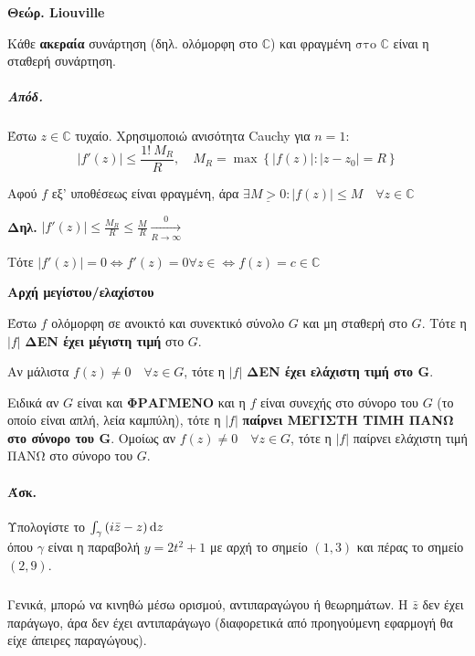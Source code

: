 \documentclass[12pt,a4paper,notitlepage,fleqn]{article}
\begin{document}
\begin{enumparen}
    	\item \textbf{Θεώρ. Liouville}

    	Κάθε \textbf{ακεραία} συνάρτηση (δηλ. ολόμορφη στο \( \mathbb C  \)) και φραγμένη
    	\( \boxed{\text{στο } \mathbb C}  \) είναι η σταθερή συνάρτηση.
    	\subparagraph{Απόδ.}
    	Έστω \( z \in \mathbb C  \) τυχαίο. Χρησιμοποιώ ανισότητα Cauchy για \( n=1 \):
    	\[
    	\left|f'(z)\right| \leq \frac{1!\ M_R}{R},\quad M_R = \max
    	\left\lbrace \left|f(z)\right|: |z-z_0|=R \right\rbrace
    	\]

    	Αφού \( f \) εξ' υποθέσεως είναι φραγμένη, άρα \( \exists \underline{M > 0}:
    	\left|f(z)\right| \leq M \quad \forall z \in \mathbb C
    	 \)

    	\textbf{Δηλ.} \(  \displaystyle
    	\left|f'(z)\right| \leq \frac{M_R}{R} \leq \frac{M}{R}
    	\xrightarrow[R\to \infty] 0
    	 \)

        Τότε \( \left|f'(z)\right| = 0 \iff f'(z)=0 \forall z\in
        \iff f(z) = c\in\mathbb C
        \)

        \item \textbf{Αρχή μεγίστου/ελαχίστου}

        Έστω \( f \) ολόμορφη σε ανοικτό και συνεκτικό σύνολο \( G \) και μη σταθερή στο
        \( G \). Τότε η \( |f| \) \textbf{ΔΕΝ έχει μέγιστη τιμή} στο \( G \).

        Αν μάλιστα \( f(z) \neq 0 \quad \forall z \in G \), τότε η \( |f| \)
        \textbf{ΔΕΝ έχει ελάχιστη τιμή στο \( \mathbf G \)}.

        Ειδικά αν \( G \) είναι και \textbf{ΦΡΑΓΜΕΝΟ} και η \( f \) είναι συνεχής στο
        σύνορο του \( G \) (το οποίο είναι απλή, λεία καμπύλη), τότε η \( |f| \)
        \textbf{παίρνει ΜΕΓΙΣΤΗ ΤΙΜΗ ΠΑΝΩ στο σύνορο του \( \mathbf G \)}.
        Ομοίως αν \( f(z) \neq 0 \quad \forall z \in G \), τότε η \( |f| \)
        παίρνει ελάχιστη τιμή ΠΑΝΩ στο σύνορο του \( G \).

    \end{enumparen}

    \paragraph{Άσκ.} Υπολογίστε το \( \int_\gamma \left( i\bar z - z \right)\mathop{}\!\mathrm{d} z \)
    \\ όπου \( \gamma \) είναι η παραβολή \( y=2t^2+1 \) με αρχή το σημείο \( (1,3) \)
    και πέρας το σημείο \( (2,9) \).
    \subparagraph{}
    Γενικά, μπορώ να κινηθώ μέσω ορισμού, αντιπαραγώγου ή θεωρημάτων. Η \( \bar z \)
    δεν έχει παράγωγο, άρα δεν έχει αντιπαράγωγο (διαφορετικά από προηγούμενη εφαρμογή
    θα είχε άπειρες παραγώγους).
\end{document}
